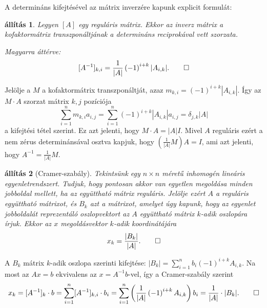 \documentclass[a4paper, showtrims]{memoir}
\makeatletter
\renewenvironment{proof}[1][\proofname]
    {\par\pushQED{\qed}%
    \normalfont \topsep6\p@\@plus6\p@\relax
    \trivlist
    \item[\hskip\labelsep
        \itshape
    #1\@addpunct{:}]\ignorespaces}
    {\popQED\endtrivlist\@endpefalse}
\theoremstyle{plain}
\newtheorem{proposition}{állítás}[chapter]
\theoremstyle{remark}
\theoremstyle{definition}
\makeatother
\begin{document}
A determináns kifejtésével az mátrix inverzére kapunk explicit formulát:
\begin{proposition}
	Legyen $[A]$ egy reguláris mátrix.
	Ekkor az inverz mátrix a kofaktormátrix transzponáltjának a determináns reciprokával vett szorzata.

	Magyarra áttérve:
	\[
		[A^{-1}]_{k,i}=\frac{1}{|A|}\left( -1 \right)^{i+k}|A_{i,k}|.\qedhere
	\]
\end{proposition}
\begin{proof}
	Jelölje a $M$ a kofaktormátrix transzponáltját,
	azaz $m_{k,i}=\left( -1 \right)^{i+k}|A_{i,k}|$.
	Így az $M\cdot A$ szorzat mátrix $k,j$ pozíciója
	\[
		\sum_{i=1}^nm_{k,i}a_{i,j}
		=
		\sum_{i=1}^n
		\left( -1 \right)^{i+k}|A_{i,k}|
		a_{i,j}
		=\delta_{j,k}|A|
	\]
	a kifejtési tétel szerint.
	Ez azt jelenti, hogy $M\cdot A=|A|I$.
	Mivel $A$ reguláris ezért a nem zérus determinánsával osztva kapjuk, hogy
	$\left(\frac{1}{|A|}M\right)A=I$,
	ami azt jelenti, hogy $A^{-1}=\frac{1}{|A|}M$.
\end{proof}
\begin{proposition}[Cramer-szabály]
	Tekintsünk egy $n\times n$ méretű inhomogén lineáris egyenletrendszert.
	Tudjuk, hogy pontosan akkor van egyetlen megoldása minden jobboldal mellett,
	ha az együttható mátrix reguláris.
	Jelölje  ezért $A$ a reguláris együttható mátrixot,
	és $B_k$ azt a mátrixot, amelyet úgy kapunk,
	hogy az egyenlet jobboldalát reprezentáló oszlopvektort az $A$ együttható mátrix $k$-adik
	oszlopára írjuk.
	Ekkor az $x$ megoldásvektor $k$-adik koordinátájára
	\[
		x_k=\frac{|B_k|}{|A|}.\qedhere
	\]
\end{proposition}
\begin{proof}
	A $B_k$ mátrix $k$-adik oszlopa szerinti kifejtése:
	\(
	|B_k|
	=
	\sum_{i=1}^nb_i\left( -1 \right)^{i+k}A_{i,k}.
	\)
	Na most az $Ax=b$ ekvivalens az $x=A^{-1}b$-vel,
	így a Cramer-szabály szerint
	\[
		x_k=[A^{-1}]_k\cdot b
		=
		\sum_{i=1}^n[A^{-1}]_{k,i}\cdot b_i
		=
		\sum_{i=1}^n\left( \frac{1}{|A|}\left( -1 \right)^{i+k}A_{i,k} \right)b_i
		=
		\frac{1}{|A|}\cdot |B_k|.\qedhere
	\]
\end{proof}
\end{document}
